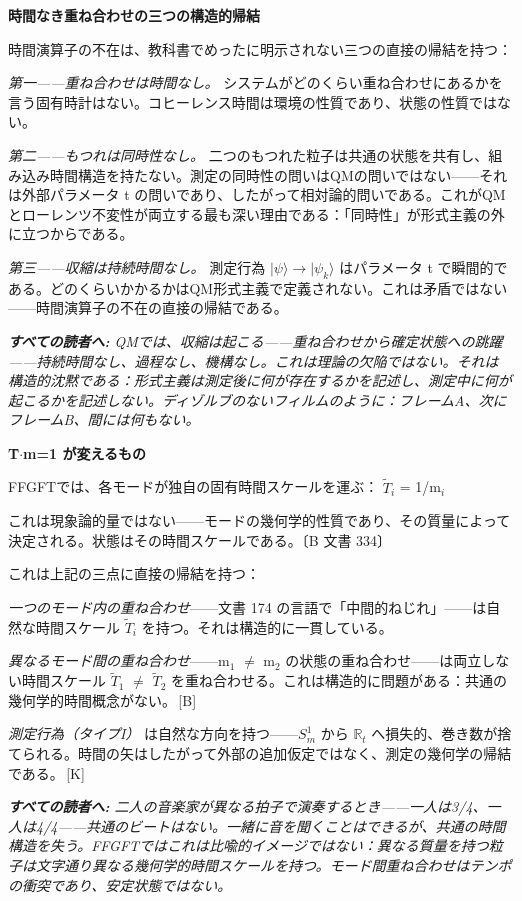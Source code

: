 \documentclass[11pt,openany]{book}
\newcommand{\status}[1]{\penalty10000\,{\tiny\textcolor{gray!70}{[#1]}}}
\newenvironment{laierspur}{%
  \par\vspace{4pt}%
  \noindent\small\itshape\color{blue!60!black}%
  \textbf{すべての読者へ:}\enspace\ignorespaces}{%
  \par\vspace{4pt}\normalsize\normalfont\normalcolor}
\begin{document}
\textbf{時間なき重ね合わせの三つの構造的帰結}

時間演算子の不在は、教科書でめったに明示されない三つの直接の帰結を持つ：

\textit{第一——重ね合わせは時間なし。} システムがどのくらい重ね合わせにあるかを言う固有時計はない。コヒーレンス時間は環境の性質であり、状態の性質ではない。

\textit{第二——もつれは同時性なし。} 二つのもつれた粒子は共通の状態を共有し、組み込み時間構造を持たない。測定の同時性の問いはQMの問いではない——それは外部パラメータ t の問いであり、したがって相対論的問いである。これがQMとローレンツ不変性が両立する最も深い理由である：「同時性」が形式主義の外に立つからである。

\textit{第三——収縮は持続時間なし。} 測定行為 $|\psi\rangle \to |\psi_k\rangle$ はパラメータ t で瞬間的である。どのくらいかかるかはQM形式主義で定義されない。これは矛盾ではない——時間演算子の不在の直接の帰結である。

\begin{laierspur}
QMでは、収縮は起こる——重ね合わせから確定状態への跳躍——持続時間なし、過程なし、機構なし。これは理論の欠陥ではない。それは構造的沈黙である：形式主義は測定後に何が存在するかを記述し、測定中に何が起こるかを記述しない。ディゾルブのないフィルムのように：フレームA、次にフレームB、間には何もない。
\end{laierspur}

\textbf{T̃$\cdot$m=1 が変えるもの}

FFGFTでは、各モードが独自の固有時間スケールを運ぶ：
$\tilde{T}_i$ = 1/m$_i$

これは現象論的量ではない——モードの幾何学的性質であり、その質量によって決定される。状態はその時間スケールである。〔B 文書 334〕

これは上記の三点に直接の帰結を持つ：

\textit{一つのモード内の重ね合わせ}——文書 174 の言語で「中間的ねじれ」——は自然な時間スケール $\tilde{T}_i$ を持つ。それは構造的に一貫している。

\textit{異なるモード間の重ね合わせ}——m$_1$ $\neq$ m$_2$ の状態の重ね合わせ——は両立しない時間スケール $\tilde{T}_1$ $\neq$ $\tilde{T}_2$ を重ね合わせる。これは構造的に問題がある：共通の幾何学的時間概念がない。\status{B}

\textit{測定行為（タイプI）} は自然な方向を持つ——$S^1_m$ から $\mathbb{R}_t$ へ損失的、巻き数が捨てられる。時間の矢はしたがって外部の追加仮定ではなく、測定の幾何学の帰結である。\status{K}

\begin{laierspur}
二人の音楽家が異なる拍子で演奏するとき——一人は3/4、一人は4/4——共通のビートはない。一緒に音を聞くことはできるが、共通の時間構造を失う。FFGFTではこれは比喩的イメージではない：異なる質量を持つ粒子は文字通り異なる幾何学的時間スケールを持つ。モード間重ね合わせはテンポの衝突であり、安定状態ではない。
\end{laierspur}
\end{document}
